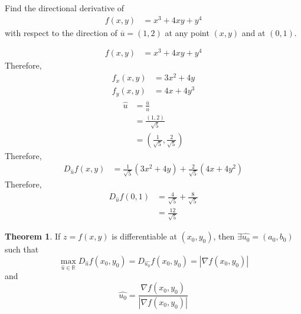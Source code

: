 \documentclass[fleqn, a4paper, 12pt, twoside]{article}
\theoremstyle{definition}
\theoremstyle{theorem}
\newtheorem{theorem}{Theorem}
\begin{document}
{\begin{question}
	Find the directional derivative of
	\begin{align*}
		f(x,y) & = x^3 + 4 x y + y^4
	\end{align*}
	with respect to the direction of $\overline{u} = (1,2)$ at any point $(x,y)$ and at $(0,1)$.
\end{question}

\begin{solution}
	\begin{align*}
		f(x,y) & = x^3 + 4 x y + y^4
	\end{align*}
	Therefore,
	\begin{align*}
		f_x(x,y) & = 3 x^2 + 4 y \\
		f_y(x,y) & = 4 x + 4 y^3
	\end{align*}
	\begin{align*}
		\hat{u} & = \frac{\overline{u}}{u} \\
                        & = \frac{(1,2)}{\sqrt{5}} \\
                        & = \left( \frac{1}{\sqrt{5}} , \frac{2}{\sqrt{5}} \right)
	\end{align*}
	Therefore,
	\begin{align*}
		D_{\hat{u}} f(x,y) & = \frac{1}{\sqrt{5}} (3 x^2 + 4 y) + \frac{2}{\sqrt{5}} (4 x + 4 y^2)
	\end{align*}
	Therefore,
	\begin{align*}
		D_{\hat{u}} f(0,1) & = \frac{4}{\sqrt{5}} + \frac{8}{\sqrt{5}} \\
                                   & = \frac{12}{\sqrt{5}}
	\end{align*}
\end{solution}

\begin{theorem}
	If $z = f(x,y)$ is differentiable at $(x_0,y_0)$, then $\exists \hat{u_0} = (a_0, b_0)$ such that
	\begin{equation*}
		\max\limits_{\hat{u} \in \mathbb{R}} D_{\hat{u}} f(x_0, y_0) = D_{\hat{u_0}} f(x_0, y_0) = \left| \nabla f(x_0, y_0) \right|
	\end{equation*}
	and
	\begin{equation*}
		\hat{u_0} = \frac{\nabla f(x_0, y_0)}{\left| \nabla f(x_0, y_0) \right|}
	\end{equation*}
\end{theorem}

}
\end{document}
